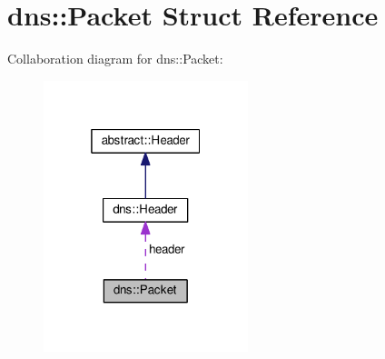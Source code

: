 \hypertarget{structdns_1_1Packet}{}\section{dns\+:\+:Packet Struct Reference}
\label{structdns_1_1Packet}


Collaboration diagram for dns\+:\+:Packet\+:
\nopagebreak
\begin{figure}[H]
\begin{center}
\leavevmode
\includegraphics[width=169pt]{structdns_1_1Packet__coll__graph}
\end{center}
\end{figure}
